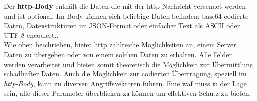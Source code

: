 Der \textbf{\ac{http}-Body} enthält die Daten die mit der \ac{http}-Nachricht versendet werden und ist optional.
Im Body können sich beliebige Daten befinden: base64 codierte Daten, Datenstrukturen im JSON-Format oder einfacher Text als ASCII oder UTF-8 encodiert.\cite{HTTPMessagesHTTP2024}.\\

Wie oben beschrieben, bietet \ac{http} zahlreiche Möglichkeiten an, einem Server Daten zu übergeben oder von einem solchen Daten zu erhalten.
Alle Felder werden verarbeitet und bieten somit theoretisch die Möglichkeit zur Übermittlung schadhafter Daten.
Auch die Möglichkeit zur codierten Übertragung, speziell im \textit{\ac{http}-Body}, kann zu diversen Angriffsvektoren führen.
Eine \ac{waf} muss in der Lage sein, alle dieser Parameter überblicken zu können um effektiven Schutz zu bieten.

\pagebreak    